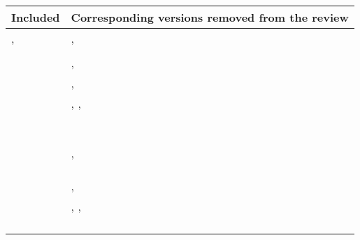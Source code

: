 \begin{table*}[!h]
{\begin{tabular}{l l}
\hline
\textbf{Included} & \textbf{Corresponding versions removed from the review}\\
\hline
\cite{hochdorfer-et-al:2009:5339626}, \cite{hochdorfer-schlegel:2009} &
\cite{hochdorfer-schlegel:2009:5354433}, \cite{hochdorfer-schlegel:2010:5651229}\\
\cite{dayoub-et-al:2011:013} &
\cite{dayoub-duckett:2008:4650701}\\
\cite{latif-et-al:2012:6385879} &
\cite{latif-et-al:2013:030}, \cite{latif-et-al:2013:0278364913498910}\\
\cite{bacca-et-al:2013:003} &
\cite{bacca-et-al:2010:291}, \cite{bacca-et-al:2011:008}\\
\cite{kawewong-et-al:2013:826410} & 
\cite{kawewong-et-al:2010:2587}, \cite{kawewong-et-al:2011:0278364910371855}, \cite{kawewong-et-al:2011:007}\\
\cite{paul-newman:2013:0278364913509859} &
\cite{paul-newman:2011:5980404}\\
\cite{carlevaris-bianco-et-al:2014:2347571} &
\cite{carlevaris-bianco-eustice:2013:6696478}\\
\cite{neubert-et-al:2015:005} &
\cite{neubert-et-al:2013:6698842}\\
\cite{ozog-et-al:2016:21582} &
\cite{ozog-eustice:2014:6907415}\\
\cite{biswas-veloso:2017:005} &
\cite{biswas-veloso:2014:6907435}\\
\cite{griffith-pradalier:2017:21664} &
\cite{griffith-pradalier:2016:1}\\
\cite{krajník-et-al:2017:2665664} &
\cite{krajník-et-al:2016:7759671}\\
\cite{arroyo-et-al:2018:7} &
\cite{arroyo-et-al:2015:7140088}, \cite{arroyo-et-al:2016:7795672}\\
\cite{han-et-al:2018:3} &
\cite{zhang-et-al:2016:043}\\
\cite{han-et-al:2018:2856274} &
\cite{han-et-al:2018}\\
\cite{mactavish-et-al:2018:21838} &
\cite{paton-et-al:2016:7759303}\\
\cite{bürki-et-al:2019:21870} &
\cite{bürki-et-al:2016:7759609}, \cite{bürki-et-al:2018:8500432}\\
\cite{labbé-michaud:2019:21831} &
\cite{labbé-michaud:2011:6048225}, \cite{labbé-michaud:2013:2242375}, \cite{labbé-michaud:2018:5}\\
\cite{gao-zhang:2020:9196906} &
\cite{gao-zhang:2020:6604}\\
\cite{berrio-et-al:2021:3094485} &
\cite{berrio-et-al:2019:8814189}\\
\cite{piasco-et-al:2021:6} &
\cite{piasco-et-al:2019:8794221}\\
\cite{bouaziz-et-al:2022:4} &
\cite{bouaziz-et-al:2021:9378614}\\
\hline

  \end{tabular}}
\end{table*}
